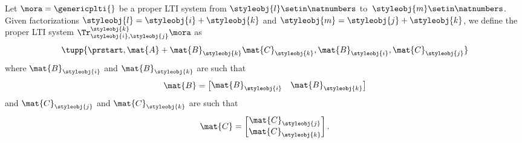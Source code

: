 %


\begin{definition}
Let $\mora = \genericplti{}$ be a proper LTI system from $\styleobj{l}\setin \natnumbers$ to~$\styleobj{m}\setin \natnumbers$. Given factorizations $\styleobj{l} = \styleobj{i} + \styleobj{k}$ and $\styleobj{m} = \styleobj{j} + \styleobj{k}$, we define the proper LTI system $\Tr_{\styleobj{i},\styleobj{j}}^{\styleobj{k}}\mora$ as   
\begin{equation}
\tupp{\prstart,\mat{A} + \mat{B}_\styleobj{k}\mat{C}_\styleobj{k},\mat{B}_\styleobj{i},\mat{C}_\styleobj{j}}
\end{equation}
where $\mat{B}_\styleobj{i}$ and $\mat{B}_\styleobj{k}$ are such that 
\begin{equation}
\mat{B} = \begin{bmatrix} \mat{B}_\styleobj{i} & \mat{B}_\styleobj{k} \end{bmatrix}
\end{equation}
and $\mat{C}_\styleobj{j}$ and $\mat{C}_\styleobj{k}$ are such that
\begin{equation}
\mat{C} = \begin{bmatrix} \mat{C}_\styleobj{j} \\ \mat{C}_\styleobj{k} \\ \end{bmatrix}.
\end{equation}
\end{definition}





